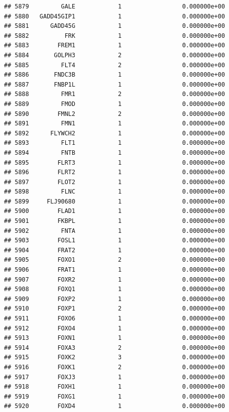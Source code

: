 \documentclass[
]{article}
\begin{document}
\begin{verbatim}
## 5879         GALE            1                 0.000000e+00
## 5880   GADD45GIP1            1                 0.000000e+00
## 5881      GADD45G            1                 0.000000e+00
## 5882          FRK            1                 0.000000e+00
## 5883        FREM1            1                 0.000000e+00
## 5884       GOLPH3            2                 0.000000e+00
## 5885         FLT4            2                 0.000000e+00
## 5886       FNDC3B            1                 0.000000e+00
## 5887       FNBP1L            1                 0.000000e+00
## 5888         FMR1            2                 0.000000e+00
## 5889         FMOD            1                 0.000000e+00
## 5890        FMNL2            2                 0.000000e+00
## 5891         FMN1            1                 0.000000e+00
## 5892      FLYWCH2            1                 0.000000e+00
## 5893         FLT1            1                 0.000000e+00
## 5894         FNTB            1                 0.000000e+00
## 5895        FLRT3            1                 0.000000e+00
## 5896        FLRT2            1                 0.000000e+00
## 5897        FLOT2            1                 0.000000e+00
## 5898         FLNC            1                 0.000000e+00
## 5899     FLJ90680            1                 0.000000e+00
## 5900        FLAD1            1                 0.000000e+00
## 5901        FKBPL            1                 0.000000e+00
## 5902         FNTA            1                 0.000000e+00
## 5903        FOSL1            1                 0.000000e+00
## 5904        FRAT2            1                 0.000000e+00
## 5905        FOXO1            2                 0.000000e+00
## 5906        FRAT1            1                 0.000000e+00
## 5907        FOXR2            1                 0.000000e+00
## 5908        FOXQ1            1                 0.000000e+00
## 5909        FOXP2            1                 0.000000e+00
## 5910        FOXP1            2                 0.000000e+00
## 5911        FOXO6            1                 0.000000e+00
## 5912        FOXO4            1                 0.000000e+00
## 5913        FOXN1            1                 0.000000e+00
## 5914        FOXA3            2                 0.000000e+00
## 5915        FOXK2            3                 0.000000e+00
## 5916        FOXK1            2                 0.000000e+00
## 5917        FOXJ3            1                 0.000000e+00
## 5918        FOXH1            1                 0.000000e+00
## 5919        FOXG1            1                 0.000000e+00
## 5920        FOXD4            1                 0.000000e+00

\end{verbatim}
\end{document}
